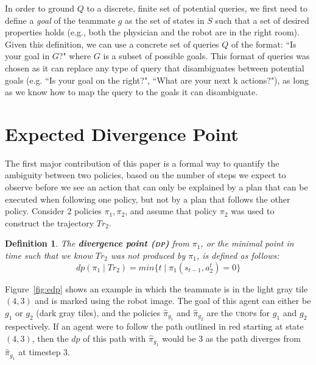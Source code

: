 \documentclass[letterpaper]{article}
\newtheorem{definition}{Definition}
\begin{document}
In order to ground $Q$ to a discrete, finite set of potential queries, we first need to define a \emph{goal} of the teammate $g$ as the set of states in $S$ such that a set of desired properties holds (e.g., both the physician and the robot are in the right room). Given this definition, we can use a concrete set of queries $Q$ of the format: ``Is your goal in $G$?" where $G$ is a subset of possible goals. This format of queries was chosen as it can replace any type of query that disambiguates between potential goals (e.g. ``Is your goal on the right?", ``What are your next k actions?"), as long as we know how to map the query to the goals it can disambiguate.


\section{Expected Divergence Point}
The first major contribution of this paper is a formal way to quantify the ambiguity between two policies, based on the number of steps we expect to observe before we see an action that can only be explained by a plan that can be executed when following one policy, but not by a plan that follows the other policy. Consider 2 policies $\pi_1,\pi_2$, %
and assume that policy $\pi_2$ was used to construct the trajectory $Tr_2$.  %
\begin{definition}
The \textbf{divergence point (\textsc{dp})} from $\pi_1$, or the minimal point in time such that we know $Tr_2$ was not produced by $\pi_1$, is defined as follows:
\begin{equation*}
    dp(\pi_1 \mid Tr_2) = min\{t \mid \pi_1(s_{t-1}, a_2^t) = 0\}
\end{equation*}
\end{definition}

Figure~\ref{fig:edp} shows an example in which the teammate is in the light gray tile $(4,3)$ and is marked using the robot image. The goal of this agent can either be $g_1$ or $g_2$ (dark gray tiles), and the policies $\hat{\pi}_{g_1}$ and $\hat{\pi}_{g_2}$ are the \textsc{urop}s for  $g_1$ and $g_2$ respectively.
If an agent were to follow the path outlined in red starting at state $(4,3)$, then the $dp$ of this path with $\hat{\pi}_{g_1}$ would be 3 as the path diverges from $\hat{\pi}_{g_1}$ at timestep 3.
\end{document}
